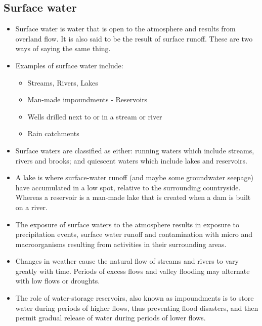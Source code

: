 \subsection{Surface water}
\begin{itemize}
\item Surface water is water that is open to the atmosphere and results from overland flow. It is also said to be the result of surface runoff. These are two ways of saying the same thing.
\item Examples of surface water include:
\begin{itemize}
\item Streams, Rivers, Lakes
\item Man-made impoundments - Reservoirs
\item Wells drilled next to or in a stream or river
\item Rain catchments
\end{itemize}
\item Surface waters are classified as either:  running waters which include streams, rivers and brooks; and quiescent waters which include lakes and reservoirs.
\
\item  A lake is where surface-water runoff (and maybe some groundwater seepage) have accumulated in a low spot, relative to the surrounding countryside.  Whereas a reservoir is a man-made lake that is created when a dam is built on a river. 
\item The exposure of surface waters to the atmosphere results in exposure to precipitation events, surface water runoff and contamination with micro and macroorganisms resulting from activities in their surrounding areas.

\item Changes in weather cause the natural flow of streams and rivers to vary greatly with time. Periods of excess flows and valley flooding may alternate with low flows or droughts.
\item  The role of water-storage reservoirs, also known as impoundments is to store water during periods of higher flows, thus preventing flood disasters, and then permit gradual release of water during periods of lower flows. 


\end{itemize}
